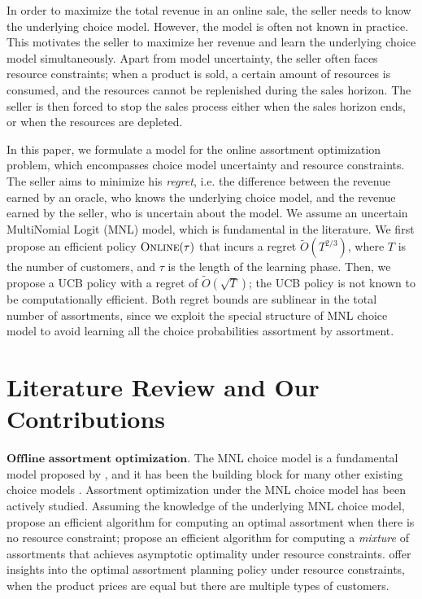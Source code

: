 \documentclass{article}
\theoremstyle{definition}
\begin{document}
In order to maximize the total revenue in an online sale, the seller needs to know the underlying choice model. However, the model is often not known in practice. This motivates the seller to maximize her revenue and learn the underlying choice model simultaneously. Apart from model uncertainty, the seller often faces resource constraints; when a product is sold, a certain amount of resources is consumed, and the resources cannot be replenished during the sales horizon. The seller is then forced to stop the sales process either when the sales horizon ends, or when the resources are depleted.

In this paper, we formulate a model for the online assortment optimization problem, which encompasses choice model uncertainty and resource constraints. The seller aims to minimize his \emph{regret}, i.e. the difference between the revenue earned by an oracle, who knows the underlying choice model, and the revenue earned by the seller, who is uncertain about the model. We assume an uncertain MultiNomial Logit (MNL) model, which is fundamental in the literature. We first propose an efficient policy $\text{{\sc Online}}(\tau)$ that incurs a regret $\tilde{O}(T^{2/3})$, where $T$ is the number of customers, and $\tau$ is the length of the learning phase. Then, we propose a UCB policy with a regret of $\tilde{O}(\sqrt{T})$; the UCB policy is not known to be computationally efficient. Both regret bounds are sublinear in the total number of assortments, since we exploit the special structure of MNL choice model to avoid learning all the choice probabilities assortment by assortment. %

\section{Literature Review and Our Contributions}\label{sec:lit}
$\textbf{Offline assortment optimization.}$ The MNL choice model is a fundamental model proposed by \cite{McFadden74}, and it has been the building block for many other existing choice models \cite{Ben-AkivaL85}. Assortment optimization under the MNL choice model has been actively studied. Assuming the knowledge of the underlying MNL choice model, \cite{TallurivR04} propose an efficient algorithm for computing an optimal assortment when there is no resource constraint; \cite{LiuV08} propose an efficient algorithm for computing a \emph{mixture} of assortments that achieves asymptotic optimality under resource constraints. \cite{BernsteinKX15} offer insights into the optimal assortment planning policy under resource constraints, when the product prices are equal but there are multiple types of customers.
\end{document}
